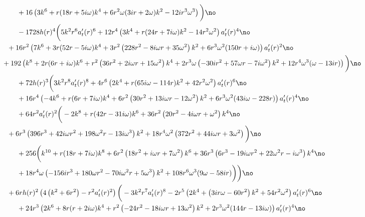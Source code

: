\documentclass[preprintnumbers,aps,prd,longbibliography,nofootinbib,nobibnotes,amsmath,amssymb]{revtex4}
\begin{document}
		\begin{align}
		&+16 \left(3 k^6+r (18 r+5 i \omega ) k^4+6 r^2 \omega  (3 i r+2 \omega ) k^2-12 i r^3 \omega ^3\right)\bigg)\no\\
		 &-1728 h(r)^4 \bigg(5 k^2 r^6 a_t'(r)^6+12 r^4 \left(3 k^4+r (24 r+7 i \omega ) k^2-14 r^2 \omega ^2\right) a_t'(r)^4\no\\
		 &\hspace{-0.5cm}+16 r^2 \left(7 k^6+3 r (52 r-5 i \omega ) k^4+3 r^2 \left(228 r^2-8 i \omega  r+35 \omega ^2\right) k^2+6 r^3 \omega ^2 (150 r+i \omega )\right) a_t'(r)^2\no\\
		 &\hspace{-0.75cm}+192 \left(k^8+2 r (6 r+i \omega ) k^6+r^2 \left(36 r^2+2 i \omega  r+15 \omega ^2\right) k^4+2 r^3 \omega  \left(-30 i r^2+57 \omega  r-7 i \omega ^2\right) k^2+12 r^4 \omega ^3 (\omega -13 i r)\right)\bigg)\no\\
		 & +72 h(r)^3 \bigg(3 k^2 r^8 a_t'(r)^8+4 r^6 \left(2 k^4+r (65 i \omega -114 r) k^2+42 r^2 \omega ^2\right) a_t'(r)^6\no\\
		 &+16 r^4 \left(-4 k^6+r (6 r+7 i \omega ) k^4+6 r^2 \left(30 r^2+13 i \omega  r-12 \omega ^2\right) k^2+6 r^3 \omega ^2 (43 i \omega -228 r)\right) a_t'(r)^4\no\\
		 &+64 r^2 a_t'(r)^2 \bigg(-2 k^8+r (42 r-31 i \omega ) k^6+36 r^2 \left(20 r^2-4 i \omega  r+\omega ^2\right) k^4\no\\
		 &\hspace{-0.5cm}+6 r^3 \left(396 r^3+42 i \omega  r^2+198 \omega ^2 r-13 i \omega ^3\right) k^2+18 r^4 \omega ^2 \left(372 r^2+44 i \omega  r+3 \omega ^2\right)\bigg) \no\\
		 &+256 \bigg(k^{10}+r (18 r+7 i \omega ) k^8+6 r^2 \left(18 r^2+i \omega  r+7 \omega ^2\right) k^6+36 r^3 \left(6 r^3-19 i \omega  r^2+22 \omega ^2 r-i \omega ^3\right) k^4\no\\
		 &+18 r^4 \omega  \left(-156 i r^3+180 \omega  r^2-70 i \omega ^2 r+5 \omega ^3\right) k^2+108 r^6 \omega ^3 (9 \omega -58 i r)\bigg)\bigg)\no\\
		 &\hspace{-0.5cm} +6 r h(r)^2 \left(4 \left(k^2+6 r^2\right)-r^2 a_t'(r){}^2\right) \bigg(-3 k^2 r^7 a_t'(r)^8-2 r^5 \left(2 k^4+\left(3 i r \omega -60 r^2\right) k^2+54 r^2 \omega ^2\right) a_t'(r)^6\no\\
		 &+24 r^3 \left(2 k^6+8 r (r+2 i \omega ) k^4+r^2 \left(-24 r^2-18 i \omega  r+13 \omega ^2\right) k^2+2 r^3 \omega ^2 (144 r-13 i \omega )\right) a_t'(r)^4\no\\

\end{align}
\end{document}

